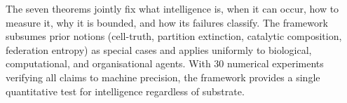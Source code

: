 \documentclass[11pt,twocolumn,a4paper]{article}
\begin{document}
The seven theorems jointly fix what intelligence is, when it can occur, how to measure
it, why it is bounded, and how its failures classify. The framework subsumes prior
notions (cell-truth, partition extinction, catalytic composition, federation entropy)
as special cases and applies uniformly to biological, computational, and organisational
agents. With $30$ numerical experiments verifying all claims to machine precision, the
framework provides a single quantitative test for intelligence regardless of substrate.



\end{document}
